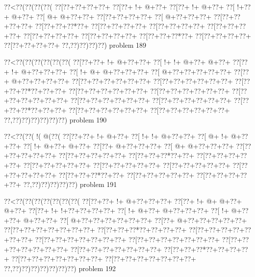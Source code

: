 \vbox{\vbox{\goo
\0??<\0??(\0??(\0??(\0??(
\0??[\0??+\0??+\0??+\0??+
\0??[\0??+\- !+\- @+\0??+
\0??[\0??+\- !+\- @+\0??+
\0??[\- !+\0??+\- @+\0??+
\0??[\- @+\- @+\0??+\0??+
\0??[\0??+\0??+\0??+\0??+
\0??[\- @+\0??+\0??+\0??+
\0??[\0??+\0??+\0??+\0??+
\0??[\0??+\0??+\0??*\0??+
\0??[\0??+\0??+\0??+\0??+
\0??[\0??+\0??+\0??+\0??+
\0??[\0??+\0??+\0??+\0??+
\0??[\0??+\0??+\0??+\0??+
\0??[\0??+\0??+\0??+\0??+
\0??[\0??+\0??+\0??*\0??+
\0??[\0??+\0??+\0??+\0??+
\0??[\0??+\0??+\0??+\0??+
\0??,\0??)\0??)\0??)\0??)
}
\hfil problem 189\hfil\break
}

\vbox{\vbox{\goo
\0??<\0??(\0??(\0??(\0??(\0??(\0??(
\0??[\0??+\0??+\- !+\- @+\0??+\0??+
\0??[\- !+\- !+\- @+\0??+\- @+\0??+
\0??[\0??+\- !+\- @+\0??+\0??+\0??+
\0??[\- !+\- @+\- @+\0??+\0??+\0??+
\0??[\- @+\0??+\0??+\0??+\0??+\0??+
\0??[\0??+\- @+\0??+\0??+\0??+\0??+
\0??[\0??+\0??+\0??+\0??+\0??+\0??+
\0??[\0??+\0??+\0??+\0??+\0??+\0??+
\0??[\0??+\0??+\0??*\0??+\0??+\0??+
\0??[\0??+\0??+\0??+\0??+\0??+\0??+
\0??[\0??+\0??+\0??+\0??+\0??+\0??+
\0??[\0??+\0??+\0??+\0??+\0??+\0??+
\0??[\0??+\0??+\0??+\0??+\0??+\0??+
\0??[\0??+\0??+\0??+\0??+\0??+\0??+
\0??[\0??+\0??+\0??*\0??+\0??+\0??+
\0??[\0??+\0??+\0??+\0??+\0??+\0??+
\0??[\0??+\0??+\0??+\0??+\0??+\0??+
\0??,\0??)\0??)\0??)\0??)\0??)\0??)
}
\hfil problem 190\hfil\break
}

\vbox{\vbox{\goo
\0??<\0??(\0??(\- !(\- @(\0??(
\0??[\0??+\0??+\- !+\- @+\0??+
\0??[\- !+\- !+\- @+\0??+\0??+
\0??[\- @+\- !+\- @+\0??+\0??+
\0??[\- !+\- @+\0??+\- @+\0??+
\0??[\0??+\- @+\0??+\0??+\0??+
\0??[\- @+\- @+\0??+\0??+\0??+
\0??[\0??+\0??+\0??+\0??+\0??+
\0??[\0??+\0??+\0??+\0??+\0??+
\0??[\0??+\0??+\0??*\0??+\0??+
\0??[\0??+\0??+\0??+\0??+\0??+
\0??[\0??+\0??+\0??+\0??+\0??+
\0??[\0??+\0??+\0??+\0??+\0??+
\0??[\0??+\0??+\0??+\0??+\0??+
\0??[\0??+\0??+\0??+\0??+\0??+
\0??[\0??+\0??+\0??*\0??+\0??+
\0??[\0??+\0??+\0??+\0??+\0??+
\0??[\0??+\0??+\0??+\0??+\0??+
\0??,\0??)\0??)\0??)\0??)\0??)
}
\hfil problem 191\hfil\break
}

\vbox{\vbox{\goo
\0??<\0??(\0??(\0??(\0??(\0??(\0??(\0??(
\0??[\0??+\0??+\- !+\- @+\0??+\0??+\0??+
\0??[\0??+\- !+\- @+\- @+\0??+\- @+\0??+
\0??[\0??+\- !+\- !+\0??+\0??+\0??+\0??+
\0??[\- !+\- @+\0??+\- @+\0??+\0??+\0??+
\0??[\- !+\- @+\0??+\0??+\- @+\0??+\0??+
\0??[\- @+\0??+\0??+\0??+\0??+\0??+\0??+
\0??[\0??+\- @+\0??+\0??+\0??+\0??+\0??+
\0??[\0??+\0??+\0??+\0??+\0??+\0??+\0??+
\0??[\0??+\0??+\0??*\0??+\0??+\0??+\0??+
\0??[\0??+\0??+\0??+\0??+\0??+\0??+\0??+
\0??[\0??+\0??+\0??+\0??+\0??+\0??+\0??+
\0??[\0??+\0??+\0??+\0??+\0??+\0??+\0??+
\0??[\0??+\0??+\0??+\0??+\0??+\0??+\0??+
\0??[\0??+\0??+\0??+\0??+\0??+\0??+\0??+
\0??[\0??+\0??+\0??*\0??+\0??+\0??+\0??+
\0??[\0??+\0??+\0??+\0??+\0??+\0??+\0??+
\0??[\0??+\0??+\0??+\0??+\0??+\0??+\0??+
\0??,\0??)\0??)\0??)\0??)\0??)\0??)\0??)
}
\hfil problem 192\hfil\break
}


